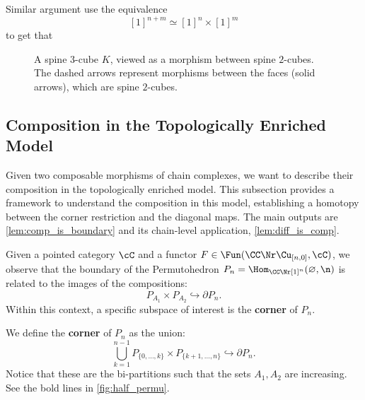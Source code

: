 Similar argument use the equivalence
\[
    [1]^{n+m} \simeq [1]^n \times [1]^m
\]
to get that 
\begin{figure}
    \centering
    \caption{A spine $3$-cube $K$, viewed as a morphism between spine $2$-cubes. The dashed arrows represent morphisms between the faces (solid arrows), which are spine $2$-cubes.}
    \label{fig:ch_to_morphism}
\end{figure}

\subsection{Composition in the Topologically Enriched Model}
Given two composable morphisms of chain complexes, we want to describe their composition in the topologically enriched model. This subsection provides a framework to understand the composition in this model, establishing a homotopy between the corner restriction and the diagonal maps. The main outputs are \cref{lem:comp_is_boundary} and its chain-level application, \cref{lem:diff_is_comp}.

Given a pointed category $\cC$ and a functor $F \in \Fun(\CC \Nr \Cu_{[n,0]}, \cC)$, we observe that the boundary of the Permutohedron $P_n = \Hom_{\CC \Nr [1]^n}(\varnothing, \n)$ is related to the images of the compositions:
\begin{equation*}
    P_{A_1} \times P_{A_2} \hookrightarrow \partial P_n.
\end{equation*}
Within this context, a specific subspace of interest is the \textbf{corner} of $P_n$.

\begin{defn}
We define the \textbf{corner} of $P_n$ as the union:
\begin{equation*}
    \bigcup_{k = 1}^{n - 1} P_{\{0, \dots, k\}} \times P_{\{k + 1, \dots, n\}} \hookrightarrow \partial P_n.
\end{equation*}
Notice that these are the bi-partitions such that the sets $A_1,A_2$ are increasing. See the bold lines in \cref{fig:half_permu}.
\end{defn}

